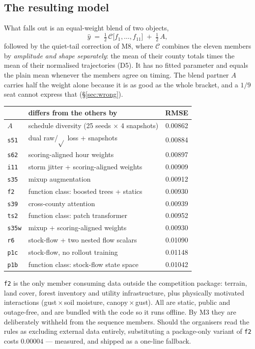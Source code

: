 \documentclass[10pt,letterpaper,twocolumn]{article}
\begin{document}
\subsection{The resulting model}

What falls out is an equal-weight blend of two objects,
\[
\hat{y} \;=\; \tfrac{1}{2}\,\mathcal{C}\big[f_1,\dots,f_{11}\big] \;+\; \tfrac{1}{2}\,A,
\]
followed by the quiet-tail correction of M8, where $\mathcal{C}$ combines the
eleven members by \emph{amplitude and shape separately}: the mean of their
county totals times the mean of their normalised trajectories (D5). It has no
fitted parameter and equals the plain mean whenever the members agree on
timing. The blend partner $A$ carries half
the weight alone because it is as good as the whole bracket, and a $1/9$ seat
cannot express that (§\ref{sec:wrong}).

\begin{center}\small
\begin{tabular}{llc}
\toprule
& differs from the others by & RMSE \\
\midrule
$A$ & schedule diversity (25 seeds $\times$ 4 snapshots) & 0.00862 \\
\midrule
\texttt{s51} & dual raw/$\sqrt{}$ loss + snapshots & 0.00884 \\
\texttt{s62} & scoring-aligned hour weights & 0.00897 \\
\texttt{i11} & storm jitter + scoring-aligned weights & 0.00909 \\
\texttt{s35} & mixup augmentation & 0.00912 \\
\texttt{f2} & function class: boosted trees + statics & 0.00930 \\
\texttt{s39} & cross-county attention & 0.00939 \\
\texttt{ts2} & function class: patch transformer & 0.00952 \\
\texttt{s35w} & mixup + scoring-aligned weights & 0.00930 \\
\texttt{r6} & stock-flow + two nested flow scalars & 0.01090 \\
\texttt{p1c} & stock-flow, no rollout training & 0.01148 \\
\texttt{p1b} & function class: stock-flow state space & 0.01042 \\
\bottomrule
\end{tabular}
\end{center}

\noindent \texttt{f2} is the only member consuming data outside the competition
package: terrain, land cover, forest inventory and utility infrastructure, plus
physically motivated interactions (gust\,$\times$\,soil moisture,
canopy\,$\times$\,gust). All are static, public and outage-free, and are bundled
with the code so it runs offline. By M3 they are deliberately withheld from the
sequence members. Should the organisers read the rules as excluding external
data entirely, substituting a package-only variant of \texttt{f2} costs
$0.00004$ --- measured, and shipped as a one-line fallback.
\end{document}
